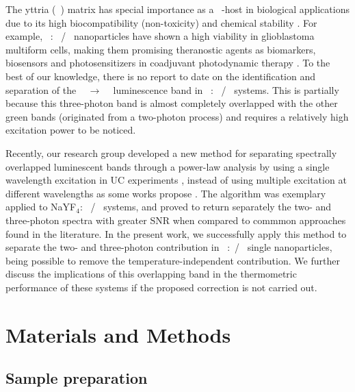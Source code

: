 \documentclass[journal=jacsat,manuscript=article, layout=twocolumn]{achemso}
\newcommand*\Yttria[1]{Y$_{2}$O$_{3}$}
\newcommand*\Yb[1]{Yb$^{3+}$}
\newcommand*\Er[1]{Er$^{3+}$}
\newcommand*\Ln[1]{Ln$^{3+}$}
\newcommand*\twoHnine[1]{$^2$H$_{9/2}$}
\newcommand*\fourIthirteen[1]{$^4$I$_{13/2}$}
\begin{document}
The yttria (\Yttria~) matrix has special importance as a \Ln~-host in biological applications due to its high biocompatibility (non-toxicity) and chemical stability \cite{Geitenbeek_2019}. For example, \Yttria~: \Yb~/\Er~ nanoparticles have shown a high viability in glioblastoma multiform cells, making them promising theranostic agents as biomarkers, biosensors and photosensitizers in coadjuvant photodynamic therapy \cite{dosSantos_2022}. To the best of our knowledge, there is no report to date on the identification and separation of the \twoHnine~ $\rightarrow$ \fourIthirteen~ luminescence band in \Yttria~: \Yb~/\Er~ systems. This is partially because this three-photon band is almost completely overlapped with the other green bands (originated from a two-photon process) and requires a relatively high excitation power to be noticed.

Recently, our research group developed a new method for separating spectrally overlapped luminescent bands through a power-law analysis by using a single wavelength excitation in UC experiments \cite{Galindo_2022}, instead of using multiple excitation at different wavelengths as some works propose \cite{Ruhl_2021, vanSwieten_2021}. The algorithm was exemplary applied to NaYF$_4$: \Yb~/\Er~ systems, and proved to return separately the two- and three-photon spectra with greater SNR when compared to commmon approaches found in the literature. In the present work, we successfully apply this method to separate the two- and three-photon contribution in \Yttria~:\Yb~/\Er~ single nanoparticles, being possible to remove the temperature-independent contribution. We further discuss the implications of this overlapping band in the thermometric performance of these systems if the proposed correction is not carried out.

\section{Materials and Methods}{\label{sec:mat&met}}

\subsection{Sample preparation}{\label{subsec:sample}}
\end{document}
